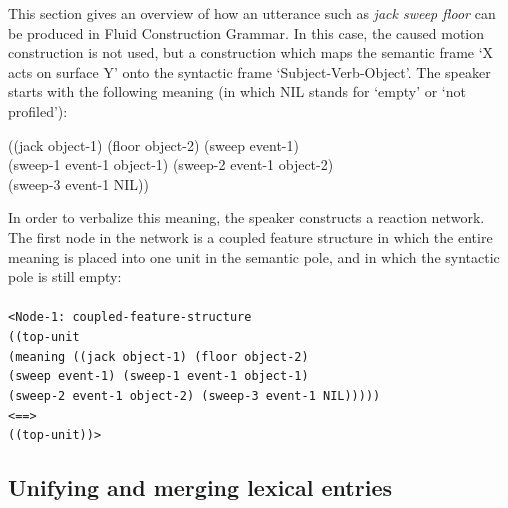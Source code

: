 This section gives an overview of how an utterance such as {\em jack sweep floor} can be produced in Fluid Construction Grammar. In this case, the caused motion construction is not used, but a construction which maps the semantic frame `X acts on surface Y' onto the syntactic frame `Subject-Verb-Object'. The speaker starts with the following meaning (in which NIL stands for `empty' or `not profiled'):

\ea
((jack object-1) (floor object-2) (sweep event-1) 
\\ \hspace*{3mm}(sweep-1 event-1 object-1) (sweep-2 event-1 object-2) 
\\ \hspace*{3mm}(sweep-3 event-1 NIL))
\z

In order to verbalize this meaning, the speaker constructs a reaction network. The first node in the network is a coupled feature structure in which the entire meaning is placed into one unit in the semantic pole, and in which the syntactic pole is still empty:
\\
\\
{\footnotesize{\tt <Node-1: coupled-feature-structure
\\ ((top-unit
\\ \hspace*{5mm} (meaning ((jack object-1) (floor object-2)
\\ \hspace*{24mm} (sweep event-1) (sweep-1 event-1 object-1)
\\ \hspace*{24mm} (sweep-2 event-1 object-2) (sweep-3 event-1 NIL)))))
\\ <==>
\\ ((top-unit))>}}

\subsection{Unifying and merging lexical entries}

